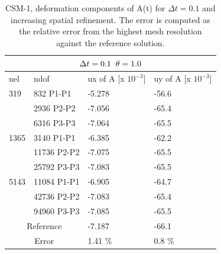 \begin{table}[h!]
\centering
\begin{tabular}{ |p{1cm}||p{2.7cm}|p{3.3cm}|p{3.3cm}|}
\hline
  \multicolumn{4}{|c|}{$\Delta t = 0.1 \hspace{2mm} \theta = 1.0$} \\
\hline
nel & ndof & ux of A [x $10^{-3}$]  &uy of A [x $10^{-3}$] \\
\hline
 319     & 832 P1-P1  & -5.278 &  -56.6 \\
     & 2936 P2-P2 & -7.056 &  -65.4 \\
      & 6316 P3-P3 &  -7.064 &   -65.5  \\
 \hline
  1365    & 3140 P1-P1  & -6.385 &  -62.2 \\
     & 11736 P2-P2 & -7.075 &  -65.5 \\
     & 25792 P3-P3 & -7.083 &  -65.5 \\
 \hline
  5143    & 11084 P1-P1 & -6.905 &  -64.7  \\
     & 42736 P2-P2 & -7.083 &  -65.4\\
     & 94960 P3-P3 & -7.085 &  -65.5  \\
  \hline
  \multicolumn{2}{|c|}{Reference}  &-7.187    & -66.1 \\
   \hline
    \multicolumn{2}{|c|}{Error}  & 1.41 \%   & 0.8 \%\\
   \hline
\end{tabular}
\caption{CSM-1, deformation components of A(t) for $\Delta t = 0.1$ and increasing spatial refinement. The error is computed as the relative error from the highest mesh resolution against the reference solution.}
\label{table:csm1}
\end{table}

